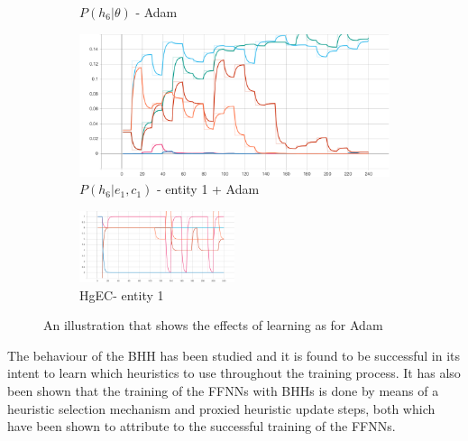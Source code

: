 \begin{figure}[htbp]
\begin{subfigure}{0.5\textwidth}
		\caption{$P\left(h_{6} | \theta \right)$ - \Acs{Adam}}
		\label{fig:results:case_study:iris:adam:p_H:6}
	\end{subfigure}
	\begin{subfigure}{0.5\textwidth}
        \centering
        \includegraphics[width=\textwidth]{analysis/bhh_case_study/iris/p_HgEC[1][6].png}
        \caption{$P\left(h_{6}|e_{1},c_{1}\right)$ - entity 1 + \Acs{Adam} }
        \label{fig:results:case_study:iris:adam:p_HgEC:1:6}
    \end{subfigure}
    \par\bigskip
	\begin{subfigure}{\textwidth}
        \centering
        \includegraphics[width=0.5\textwidth]{analysis/bhh_case_study/iris/HgEC[1].png}
        \caption{HgEC\rbrack - entity 1}
        \label{fig:results:case_study:iris:adam:HgEC:1}
    \end{subfigure}
    \par\bigskip
	\caption{An illustration that shows the effects of learning as for \Acs{Adam}}
	\label{fig:results:case_study:iris:adam:HgEC}
\end{figure}


The behaviour of the \Ac{BHH} has been studied and it is found to be successful in its intent to learn which heuristics to use throughout the training process. It has also been shown that the training of the \acp{FFNN} with \Acp{BHH} is done by means of a heuristic selection mechanism and proxied heuristic update steps, both which have been shown to attribute to the successful training of the \acp{FFNN}.

